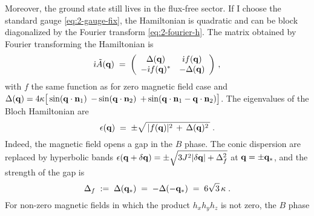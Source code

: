 
Moreover, the ground state still lives in the flux-free sector. If I choose the standard gauge \eqref{eq:2-gauge-fix}, the Hamiltonian is quadratic  and can be block diagonalized by the Fourier transform \eqref{eq:2-fourier-h}. The matrix obtained by Fourier transforming the Hamiltonian is 
\begin{equation}
    \im \tilde{A}(\bf{q}) \; = \;\left( \begin{array}{cc}
         \Delta (\bf{q} ) &\im f(\bf{q})   \\
        -\im f(\bf{q})^{\ast}  & -\Delta(\bf{q}) 
    \end{array}  \right)\, , \label{eq:2-fourier-A-withB} %
\end{equation}
with $f$ the same function as for zero magnetic field case and $\Delta(\bf{q}) = 4 \kappa \big[ \sin (\bf{q}\cdot\bf{n}_1) $ $- \sin (\bf{q}\cdot\bf{n}_2)$ $+ \sin (\bf{q}\cdot\bf{n}_1 - \bf{q}\cdot\bf{n}_2) \big]$. The eigenvalues of the Bloch Hamiltonian are
\begin{equation}
    \epsilon(\bf{q}) \; = \; \pm \sqrt{ \, \vert f(\bf{q}) \vert^2 \,  +  \, \Delta(\bf{q})^2 \, } \; . \label{eq:2-disp-mag}
\end{equation}
Indeed, the magnetic field opens a gap in the $B$ phase. The conic dispersion are replaced by hyperbolic bands $\epsilon(  \bf{q} + \delta \bf{q}) = \pm \sqrt{ 3 J^2 \vert \delta \bf{q} \vert + \Delta_f^2 }$ at $\bf{q}= \pm \bf{q}_{\ast}$, and the strength of the gap is 
\begin{equation}
    \Delta_{f} \; := \; \Delta(\bf{q}_{\ast}) \; = \; - \Delta( - \bf{q}_{\ast} ) \; = \;  6 \sqrt{3} \, \kappa \; .
\end{equation}
For non-zero magnetic fields in which the product $h_xh_yh_z$ is not zero, the $B$ phase 


